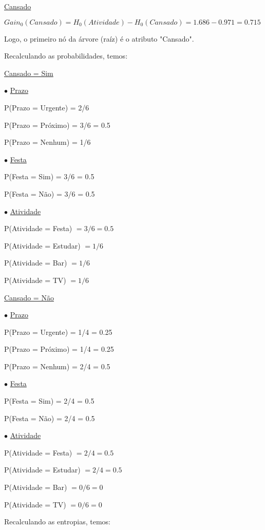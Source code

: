 \documentclass{article}
\begin{document}
\quad \underline{Cansado}

\qquad $Gain_{0}(Cansado) = H_{0}(Atividade) - H_{0}(Cansado) = 1.686 - 0.971 = 0.715$

\bigskip
\quad Logo, o primeiro nó da árvore (raíz) é o atributo "Cansado".

\quad Recalculando as probabilidades, temos:

\bigskip
\quad \underline{Cansado = Sim}

\qquad $\bullet$ \underline{Prazo}

\quad \qquad P(Prazo = Urgente) = 2/6

\quad \qquad P(Prazo = Próximo) = 3/6 = 0.5

\quad \qquad P(Prazo = Nenhum) = 1/6

\bigskip
\qquad $\bullet$ \underline{Festa}

\quad \qquad P(Festa = Sim) = 3/6 = 0.5

\quad \qquad P(Festa = Não) = 3/6 = 0.5

\bigskip
\qquad $\bullet$ \underline{Atividade}

\quad \qquad P(Atividade = Festa) $= 3/6 = 0.5$

\quad \qquad P(Atividade = Estudar) $= 1/6$

\quad \qquad P(Atividade = Bar) $= 1/6$

\quad \qquad P(Atividade = TV) $= 1/6$

\bigskip
\quad \underline{Cansado = Não}

\qquad $\bullet$ \underline{Prazo}

\quad \qquad P(Prazo = Urgente) = 1/4 = 0.25

\quad \qquad P(Prazo = Próximo) = 1/4 = 0.25

\quad \qquad P(Prazo = Nenhum) = 2/4 = 0.5

\bigskip
\qquad $\bullet$ \underline{Festa}

\quad \qquad P(Festa = Sim) = 2/4 = 0.5

\quad \qquad P(Festa = Não) = 2/4 = 0.5

\bigskip
\qquad $\bullet$ \underline{Atividade}

\quad \qquad P(Atividade = Festa) $= 2/4 = 0.5$

\quad \qquad P(Atividade = Estudar) $= 2/4 = 0.5$

\quad \qquad P(Atividade = Bar) $= 0/6 = 0$

\quad \qquad P(Atividade = TV) $= 0/6 = 0$

\bigskip
\quad Recalculando as entropias, temos:
\end{document}
